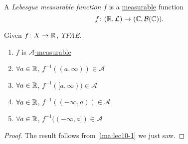 \begin{definition}\label{def:Lebesgue-measurable-function}
	A \emph{Lebesgue measurable function} \(f\) is a \hyperref[def:measurable-function]{measurable} function
	\[
		f\colon (\mathbb{\MakeUppercase{r}} , \mathcal{\MakeUppercase{l}} ) \to (\mathbb{\MakeUppercase{c}} , \mathcal{\MakeUppercase{b}} (\mathbb{\MakeUppercase{c}})).
	\]
\end{definition}

\begin{lemma}\label{lma:lec10-2}
	Given \(f\colon X\to \mathbb{\MakeUppercase{r}} \), \emph{TFAE}.
	\begin{enumerate}
		\item \(f\) is \hyperref[def:A-measurable-function]{\(\mathcal{A}\)-measurable}
		\item \(\forall a\in\mathbb{\MakeUppercase{r}} \), \(f^{-1} ((a, \infty ))\in\mathcal{A} \)
		\item \(\forall a\in\mathbb{\MakeUppercase{r}} \), \(f^{-1} ([a, \infty ))\in\mathcal{A} \)
		\item \(\forall a\in\mathbb{\MakeUppercase{r}} \), \(f^{-1} ((-\infty, a))\in\mathcal{A} \)
		\item \(\forall a\in\mathbb{\MakeUppercase{r}} \), \(f^{-1} ((-\infty, a])\in\mathcal{A} \)
	\end{enumerate}
\end{lemma}
\begin{proof}
	The result follows from \autoref{lma:lec10-1} we just saw.
\end{proof}

